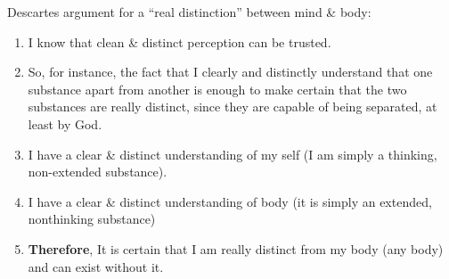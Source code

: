 \documentclass{article}
\begin{document}
    \begin{spacing}{1.2}
    \newpage
    Descartes argument for a ``real distinction'' between mind \& body:
    \begin{enumerate}
        \item I know that clean \& distinct perception can be trusted.
        
        \item So, for instance, the fact that I clearly and distinctly understand that one substance apart from another is enough to make certain that the two substances are really distinct, since they are capable of being separated, at least by God.
        
        \item I have a clear \& distinct understanding of my self (I am simply a thinking, non-extended substance).

        \item I have a clear \& distinct understanding of body (it is simply an extended, nonthinking substance)

        \item \textbf{Therefore}, It is certain that I am really distinct from my body (any body) and can exist without it.
    \end{enumerate}
    \end{spacing}
    
\end{document}
